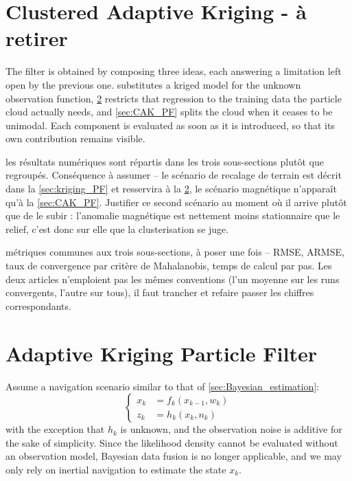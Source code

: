 \section{Clustered Adaptive Kriging - à retirer}\label{sec:CAK}

The filter is obtained by composing three ideas, each answering a limitation left open by the previous one.  substitutes a kriged model for the unknown observation function, \cref{sec:AK_PF} restricts that regression to the training data the particle cloud actually needs, and \cref{sec:CAK_PF} splits the cloud when it ceases to be unimodal. Each component is evaluated as soon as it is introduced, so that its own contribution remains visible.

{les résultats numériques sont répartis dans les trois sous-sections plutôt que regroupés. Conséquence à assumer -- le scénario de recalage de terrain est décrit dans la \cref{sec:kriging_PF} et resservira à la \cref{sec:AK_PF}, le scénario magnétique n'apparaît qu'à la \cref{sec:CAK_PF}. Justifier ce second scénario au moment où il arrive plutôt que de le subir : l'anomalie magnétique est nettement moins stationnaire que le relief, c'est donc sur elle que la clusterisation se juge.}

{métriques communes aux trois sous-sections, à poser une fois -- RMSE, ARMSE, taux de convergence par critère de Mahalanobis, temps de calcul par pas. Les deux articles n'emploient pas les mêmes conventions (l'un moyenne sur les runs convergents, l'autre sur tous), il faut trancher et refaire passer les chiffres correspondants.}

\section{Adaptive Kriging Particle Filter}\label{sec:AK_PF}

Assume a navigation scenario similar to that of \cref{sec:Bayesian_estimation}:
\begin{equation}
	\left\{\begin{aligned}
	x_k&=f_k(x_{k-1},w_k)\\
	z_k&=h_k(x_k,n_k)
	\end{aligned}\right.
\end{equation}
with the exception that $h_k$ is unknown, and the observation noise is additive for the sake of simplicity. Since the likelihood density cannot be evaluated without an observation model, Bayesian data fusion is no longer applicable, and we may only rely on inertial navigation to estimate the state $x_k$.

